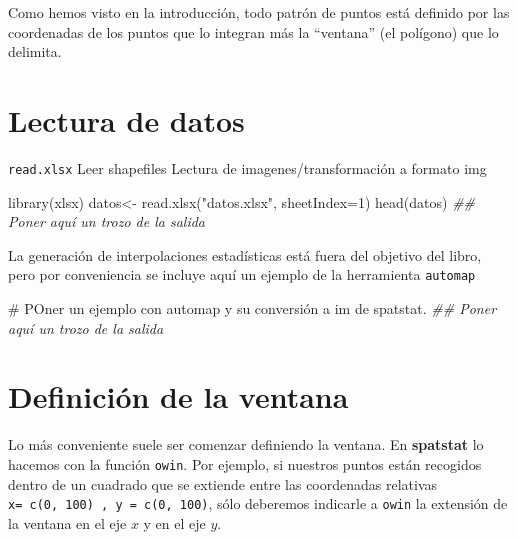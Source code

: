 \documentclass[
  letterpaper,
  DIV=11,
  numbers=noendperiod]{scrreprt}
\newenvironment{Shaded}{\begin{snugshade}}{\end{snugshade}}
\newcommand{\AttributeTok}[1]{\textcolor[rgb]{0.40,0.45,0.13}{#1}}
\newcommand{\CommentTok}[1]{\textcolor[rgb]{0.37,0.37,0.37}{#1}}
\newcommand{\DecValTok}[1]{\textcolor[rgb]{0.68,0.00,0.00}{#1}}
\newcommand{\DocumentationTok}[1]{\textcolor[rgb]{0.37,0.37,0.37}{\textit{#1}}}
\newcommand{\FunctionTok}[1]{\textcolor[rgb]{0.28,0.35,0.67}{#1}}
\newcommand{\NormalTok}[1]{\textcolor[rgb]{0.00,0.23,0.31}{#1}}
\newcommand{\OtherTok}[1]{\textcolor[rgb]{0.00,0.23,0.31}{#1}}
\newcommand{\StringTok}[1]{\textcolor[rgb]{0.13,0.47,0.30}{#1}}
\begin{document}
Como hemos visto en la introducción, todo patrón de puntos está definido
por las coordenadas de los puntos que lo integran más la ``ventana'' (el
polígono) que lo delimita.

\hypertarget{lectura-de-datos}{%
\section{Lectura de datos}\label{lectura-de-datos}}

\texttt{read.xlsx} Leer shapefiles Lectura de imagenes/transformación a
formato img

\begin{Shaded}
\begin{Highlighting}[]
\FunctionTok{library}\NormalTok{(xlsx)}
\NormalTok{datos}\OtherTok{\textless{}{-}} \FunctionTok{read.xlsx}\NormalTok{(}\StringTok{"datos.xlsx"}\NormalTok{, }\AttributeTok{sheetIndex=}\DecValTok{1}\NormalTok{)}
\FunctionTok{head}\NormalTok{(datos)}
\DocumentationTok{\#\# Poner aquí un trozo de la salida}
\end{Highlighting}
\end{Shaded}

\begin{tcolorbox}[enhanced jigsaw, colback=white, breakable, rightrule=.15mm, opacityback=0, arc=.35mm, toprule=.15mm, leftrule=.75mm, bottomrule=.15mm, colframe=quarto-callout-color-frame, left=2mm]

La generación de interpolaciones estadísticas está fuera del objetivo
del libro, pero por conveniencia se incluye aquí un ejemplo de la
herramienta \texttt{automap}

\begin{Shaded}
\begin{Highlighting}[]
\CommentTok{\# POner un ejemplo con automap y su conversión a im de spatstat.}
\DocumentationTok{\#\# Poner aquí un trozo de la salida}
\end{Highlighting}
\end{Shaded}

\end{tcolorbox}

\hypertarget{definiciuxf3n-de-la-ventana}{%
\section{Definición de la ventana}\label{definiciuxf3n-de-la-ventana}}

Lo más conveniente suele ser comenzar definiendo la ventana. En
\textbf{spatstat} lo hacemos con la función \texttt{owin}. Por ejemplo,
si nuestros puntos están recogidos dentro de un cuadrado que se extiende
entre las coordenadas relativas
\texttt{x=\ c(0,\ 100)\ ,\ y\ =\ c(0,\ 100)}, sólo deberemos indicarle a
\texttt{owin} la extensión de la ventana en el eje \(x\) y en el eje
\(y\).
\end{document}
